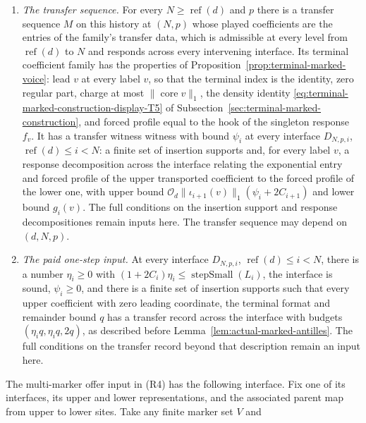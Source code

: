 \begin{enumerate}
  terminal level $N\geq\operatorname{ref}(d)$ and period $p$ there is
  $X\geq1$ with $|T(e_j)(0,U)|\leq X$ for all axes and configurations,
  the footprint of $T$ at the origin has cover number at most one, and
  $e^{\alpha_N+2}X\theta_N^{-q}\zeta_{d,N}\leq u_N$.
\item[(R6)] \emph{The transfer sequence.} For every $N\geq\operatorname{ref}(d)$
  and $p$ there is a transfer sequence $M$ on this history at $(N,p)$ whose played
  coefficients are the entries of the family's transfer data, which is
  admissible at every level from $\operatorname{ref}(d)$ to $N$ and responds
  across every intervening interface. Its terminal coefficient family has the properties
  of Proposition~\ref{prop:terminal-marked-voice}: lead $v$ at every
  label $v$, so that the terminal index is the identity, zero regular
  part, charge at most $\|\operatorname{core}v\|_1$, the density identity
  \eqref{eq:terminal-marked-construction-display-T5} of Subsection~\ref{sec:terminal-marked-construction}, and forced
  profile equal to the hook of the singleton response $f_v$. It has a transfer witness
witness with bound $\psi_i$ at every interface
  $D_{N,p,i}$, $\operatorname{ref}(d)\leq i<N$: a finite set of insertion supports
  and, for every label $v$, a response decomposition across the interface relating the
  exponential entry and forced profile of the upper transported coefficient
  to the forced profile of the lower one, with upper bound
  $\mathcal O_d\|\iota_{i+1}(v)\|_1(\psi_i+2C_{i+1})$ and lower bound
  $g_i(v)$. The full conditions on the insertion support and response decompositiones remain
  inputs here. The transfer sequence may depend on
  $(d,N,p)$.
\item[(R7)] \emph{The paid one-step input.} At every interface $D_{N,p,i}$,
  $\operatorname{ref}(d)\leq i<N$, there is a number $\eta_i\geq0$ with
  $(1+2C_i)\eta_i\leq\operatorname{stepSmall}(L_i)$, the interface is sound,
  $\psi_i\geq0$, and there is a finite set of insertion supports such that every
  upper coefficient with zero leading coordinate, the terminal format
  and remainder bound $q$ has a transfer record across the interface with budgets
  $(\eta_iq,\eta_iq,2q)$, as described before
  Lemma~\ref{lem:actual-marked-antilles}. The full conditions on the
  transfer record beyond that description remain an input here.
\end{enumerate}
The multi-marker offer input in (R4) has the following interface. Fix
one of its interfaces, its upper and lower representations, and the associated
parent map from upper to lower sites. Take any finite marker set $V$ and
